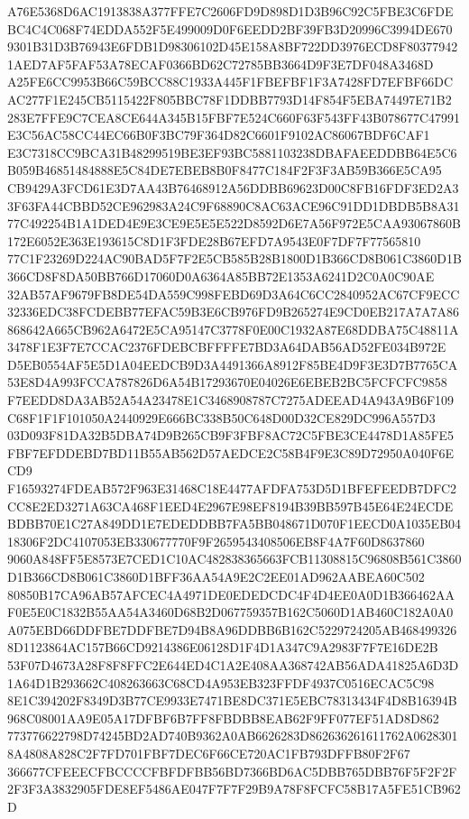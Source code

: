 \documentclass[UTF8,fontset=fandol,zihao=-4,a4paper]{ctexart}
\begin{document}
{{A76E5368D6AC1913838A377FFE7C2606FD9D898D1D3B96C92C5FBE3C6FDEBC4C4C068F74EDDA552F5E499009D0F6EEDD2BF39FB3D20996C3994DE670
9301B31D3B76943E6FDB1D98306102D45E158A8BF722DD3976ECD8F803779421AED7AF5FAF53A78ECAF0366BD62C72785BB3664D9F3E7DF048A3468D
A25FE6CC9953B66C59BCC88C1933A445F1FBEFBF1F3A7428FD7EFBF66DCAC277F1E245CB5115422F805BBC78F1DDBB7793D14F854F5EBA74497E71B2
283E7FFE9C7CEA8CE644A345B15FBF7E524C660F63F543FF43B078677C47991E3C56AC58CC44EC66B0F3BC79F364D82C6601F9102AC86067BDF6CAF1
E3C7318CC9BCA31B48299519BE3EF93BC5881103238DBAFAEEDDBB64E5C6B059B46851484888E5C84DE7EBEB8B0F8477C184F2F3F3AB59B366E5CA95
CB9429A3FCD61E3D7AA43B76468912A56DDBB69623D00C8FB16FDF3ED2A33F63FA44CBBD52CE962983A24C9F68890C8AC63ACE96C91DD1DBDB5B8A31
77C492254B1A1DED4E9E3CE9E5E5E522D8592D6E7A56F972E5CAA93067860B172E6052E363E193615C8D1F3FDE28B67EFD7A9543E0F7DF7F77565810
77C1F23269D224AC90BAD5F7F2E5CB585B28B1800D1B366CD8B061C3860D1B366CD8F8DA50BB766D17060D0A6364A85BB72E1353A6241D2C0A0C90AE
32AB57AF9679FB8DE54DA559C998FEBD69D3A64C6CC2840952AC67CF9ECC32336EDC38FCDEBB77EFAC59B3E6CB976FD9B265274E9CD0EB217A7A7A86
868642A665CB962A6472E5CA95147C3778F0E00C1932A87E68DDBA75C48811A3478F1E3F7E7CCAC2376FDEBCBFFFFE7BD3A64DAB56AD52FE034B972E
D5EB0554AF5E5D1A04EEDCB9D3A4491366A8912F85BE4D9F3E3D7B7765CA53E8D4A993FCCA787826D6A54B17293670E04026E6EBEB2BC5FCFCFC9858
F7EEDD8DA3AB52A54A23478E1C3468908787C7275ADEEAD4A943A9B6F109C68F1F1F101050A2440929E666BC338B50C648D00D32CE829DC996A557D3
03D093F81DA32B5DBA74D9B265CB9F3FBF8AC72C5FBE3CE4478D1A85FE5FBF7EFDDEBD7BD11B55AB562D57AEDCE2C58B4F9E3C89D72950A040F6ECD9
F16593274FDEAB572F963E31468C18E4477AFDFA753D5D1BFEFEEDB7DFC2CC8E2ED3271A63CA468F1EED4E2967E98EF8194B39BB597B45E64E24ECDE
BDBB70E1C27A849DD1E7EDEDDBB7FA5BB048671D070F1EECD0A1035EB0418306F2DC4107053EB330677770F9F2659543408506EB8F4A7F60D8637860
9060A848FF5E8573E7CED1C10AC482838365663FCB11308815C96808B561C3860D1B366CD8B061C3860D1BFF36AA54A9E2C2EE01AD962AABEA60C502
80850B17CA96AB57AFCEC4A4971DE0EDEDCDC4F4D4EE0A0D1B366462AAF0E5E0C1832B55AA54A3460D68B2D067759357B162C5060D1AB460C182A0A0
A075EBD66DDFBE7DDFBE7D94B8A96DDBB6B162C5229724205AB4684993268D1123864AC157B66CD9214386E06128D1F4D1A347C9A2983F7F7E16DE2B
53F07D4673A28F8F8FFC2E644ED4C1A2E408AA368742AB56ADA41825A6D3D1A64D1B293662C408263663C68CD4A953EB323FFDF4937C0516ECAC5C98
8E1C394202F8349D3B77CE9933E7471BE8DC371E5EBC78313434F4D8B16394B968C08001AA9E05A17DFBF6B7FF8FBDBB8EAB62F9FF077EF51AD8D862
773776622798D74245BD2AD740B9362A0AB6626283D862636261611762A06283018A4808A828C2F7FD701FBF7DEC6F66CE720AC1FB793DFFB80F2F67
366677CFEEECFBCCCCFBFDFBB56BD7366BD6AC5DBB765DBB76F5F2F2F2F3F3A3832905FDE8EF5486AE047F7F7F29B9A78F8FCFC58B17A5FE51CB962D
}}
\end{document}
